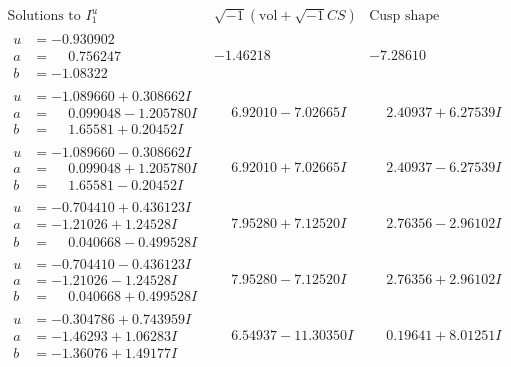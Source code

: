 \documentclass[1p]{elsarticle_modified}
\theoremstyle{definition}
\newcommand{\I}{\sqrt{-1}}
\begin{document}
$$\begin{array}{c|c|c}  
\text{Solutions to }I^u_{1}& \I (\text{vol} + \sqrt{-1}CS) & \text{Cusp shape}\\
 \hline 
\begin{aligned}
u &= -0.930902\phantom{ +0.000000I} \\
a &= \phantom{-}0.756247\phantom{ +0.000000I} \\
b &= -1.08322\phantom{ +0.000000I}\end{aligned}
 & -1.46218\phantom{ +0.000000I} & -7.28610\phantom{ +0.000000I} \\ \hline\begin{aligned}
u &= -1.089660 + 0.308662 I \\
a &= \phantom{-}0.099048 - 1.205780 I \\
b &= \phantom{-}1.65581 + 0.20452 I\end{aligned}
 & \phantom{-}6.92010 - 7.02665 I & \phantom{-}2.40937 + 6.27539 I \\ \hline\begin{aligned}
u &= -1.089660 - 0.308662 I \\
a &= \phantom{-}0.099048 + 1.205780 I \\
b &= \phantom{-}1.65581 - 0.20452 I\end{aligned}
 & \phantom{-}6.92010 + 7.02665 I & \phantom{-}2.40937 - 6.27539 I \\ \hline\begin{aligned}
u &= -0.704410 + 0.436123 I \\
a &= -1.21026 + 1.24528 I \\
b &= \phantom{-}0.040668 - 0.499528 I\end{aligned}
 & \phantom{-}7.95280 + 7.12520 I & \phantom{-}2.76356 - 2.96102 I \\ \hline\begin{aligned}
u &= -0.704410 - 0.436123 I \\
a &= -1.21026 - 1.24528 I \\
b &= \phantom{-}0.040668 + 0.499528 I\end{aligned}
 & \phantom{-}7.95280 - 7.12520 I & \phantom{-}2.76356 + 2.96102 I \\ \hline\begin{aligned}
u &= -0.304786 + 0.743959 I \\
a &= -1.46293 + 1.06283 I \\
b &= -1.36076 + 1.49177 I\end{aligned}
 & \phantom{-}6.54937 - 11.30350 I & \phantom{-}0.19641 + 8.01251 I \\ \hline\begin{aligned}

\end{aligned}
\end{array}$$
\end{document}
